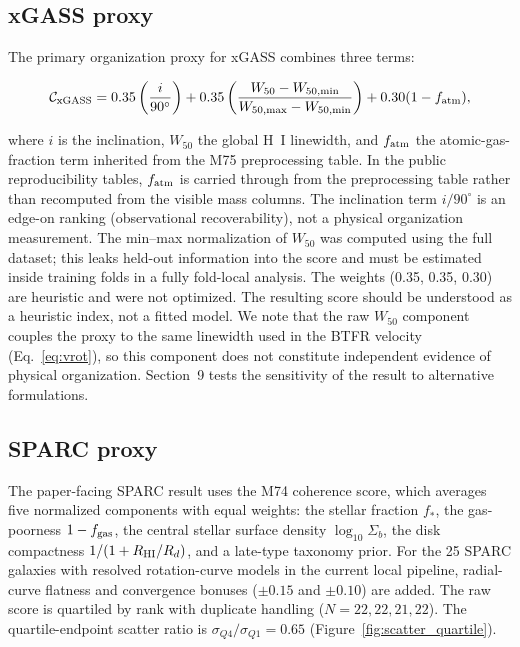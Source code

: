 \documentclass[11pt]{article}
\begin{document}
\subsection{xGASS proxy}

The primary organization proxy for xGASS combines three terms:

\begin{equation}
\mathcal{C}_{\rm xGASS} =
0.35 \left(\frac{i}{90^\circ}\right)
+ 0.35 \left(\frac{W_{50} - W_{50,\min}}{W_{50,\max} - W_{50,\min}}
\right)
+ 0.30 (1 - f_{\rm atm}),
\end{equation}

where $i$ is the inclination, $W_{50}$ the global H~I linewidth, and $f_{\rm atm}$ the atomic-gas-fraction term inherited from the M75 preprocessing table. In the public reproducibility tables, $f_{\rm atm}$ is carried through from the preprocessing table rather than recomputed from the visible mass columns. The inclination term $i/90^\circ$ is an edge-on ranking (observational recoverability), not a physical organization measurement. The min--max normalization of $W_{50}$ was computed using the full dataset; this leaks held-out information into the score and must be estimated inside training folds in a fully fold-local analysis. The weights (0.35, 0.35, 0.30) are heuristic and were not optimized. The resulting score should be understood as a heuristic index, not a fitted model. We note that the raw $W_{50}$ component couples the proxy to the same linewidth used in the BTFR velocity (Eq.~\ref{eq:vrot}), so this component does not constitute independent evidence of physical organization. Section~9 tests the sensitivity of the result to alternative formulations.

\subsection{SPARC proxy}

The paper-facing SPARC result uses the M74 coherence score, which averages five normalized components with equal weights: the stellar fraction $f_*$, the gas-poorness $1-f_{\rm gas}$, the central stellar surface density $\log_{10}\Sigma_b$, the disk compactness $1/(1+R_{\rm HI}/R_d)$, and a late-type taxonomy prior. For the 25 SPARC galaxies with resolved rotation-curve models in the current local pipeline, radial-curve flatness and convergence bonuses ($\pm 0.15$ and $\pm 0.10$) are added. The raw score is quartiled by rank with duplicate handling ($N=22,22,21,22$). The quartile-endpoint scatter ratio is $\sigma_{Q4}/\sigma_{Q1} = 0.65$ (Figure~\ref{fig:scatter_quartile}).
\end{document}
